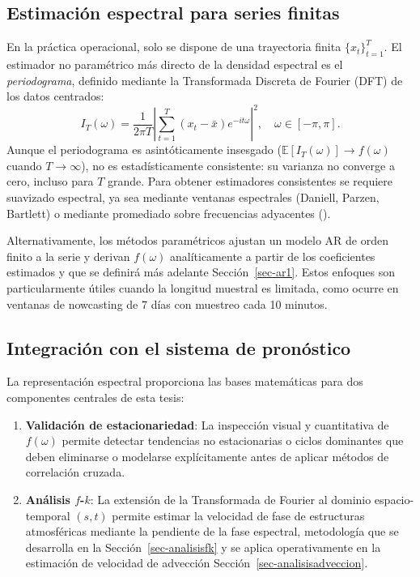 \documentclass[
  spanish,
  us-letterpaper,
]{scrreprt}
\providecommand{\tightlist}{%
  \setlength{\itemsep}{0pt}\setlength{\parskip}{0pt}}
\numberwithin{equation}{section}
\begin{document}
\subsection{Estimación espectral para series
finitas}\label{estimaciuxf3n-espectral-para-series-finitas}

En la práctica operacional, solo se dispone de una trayectoria finita
\(\{x_t\}_{t=1}^T\). El estimador no paramétrico más directo de la
densidad espectral es el \emph{periodograma}, definido mediante la
Transformada Discreta de Fourier (DFT) de los datos centrados: \[
I_T(\omega) = \frac{1}{2\pi T} \left| \sum_{t=1}^T (x_t - \bar{x}) e^{-i t \omega} \right|^2, \quad \omega \in [-\pi, \pi].
\] Aunque el periodograma es asintóticamente insesgado
(\(\mathbb{E}[I_T(\omega)] \to f(\omega)\) cuando \(T \to \infty\)), no
es estadísticamente consistente: su varianza no converge a cero, incluso
para \(T\) grande. Para obtener estimadores consistentes se requiere
suavizado espectral, ya sea mediante ventanas espectrales (Daniell,
Parzen, Bartlett) o mediante promediado sobre frecuencias adyacentes
().

Alternativamente, los métodos paramétricos ajustan un modelo AR de orden
finito a la serie y derivan \(f(\omega)\) analíticamente a partir de los
coeficientes estimados y que se definirá más adelante
Sección~\ref{sec-ar1}. Estos enfoques son particularmente útiles cuando
la longitud muestral es limitada, como ocurre en ventanas de nowcasting
de 7 días con muestreo cada 10 minutos.

\subsection{Integración con el sistema de
pronóstico}\label{integraciuxf3n-con-el-sistema-de-pronuxf3stico}

La representación espectral proporciona las bases matemáticas para dos
componentes centrales de esta tesis:

\begin{enumerate}
\def\labelenumi{\arabic{enumi}.}
\tightlist
\item
  \textbf{Validación de estacionariedad}: La inspección visual y
  cuantitativa de \(f(\omega)\) permite detectar tendencias no
  estacionarias o ciclos dominantes que deben eliminarse o modelarse
  explícitamente antes de aplicar métodos de correlación cruzada.
\item
  \textbf{Análisis \(f\)-\(k\)}: La extensión de la Transformada de
  Fourier al dominio espacio-temporal \((s,t)\) permite estimar la
  velocidad de fase de estructuras atmosféricas mediante la pendiente de
  la fase espectral, metodología que se desarrolla en la
  Sección~\ref{sec-analisisfk} y se aplica operativamente en la
  estimación de velocidad de advección
  Sección~\ref{sec-analisisadveccion}.
\end{enumerate}
\end{document}

